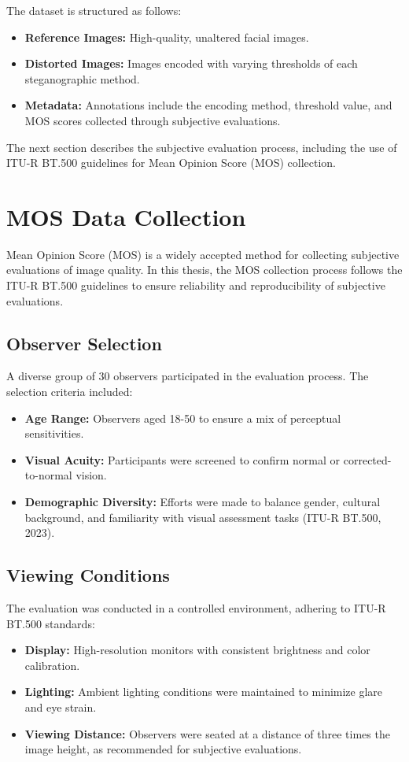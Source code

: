The dataset is structured as follows:
\begin{itemize}
    \item \textbf{Reference Images:} High-quality, unaltered facial images.
    \item \textbf{Distorted Images:} Images encoded with varying thresholds of each steganographic method.
    \item \textbf{Metadata:} Annotations include the encoding method, threshold value, and MOS scores collected through subjective evaluations.
\end{itemize}

The next section describes the subjective evaluation process, including the use of ITU-R BT.500 guidelines for Mean Opinion Score (MOS) collection.

\section{MOS Data Collection}

Mean Opinion Score (MOS) is a widely accepted method for collecting subjective evaluations of image quality. In this thesis, the MOS collection process follows the ITU-R BT.500 guidelines to ensure reliability and reproducibility of subjective evaluations.

\subsection{Observer Selection}

A diverse group of 30 observers participated in the evaluation process. The selection criteria included:
\begin{itemize}
    \item \textbf{Age Range:} Observers aged 18-50 to ensure a mix of perceptual sensitivities.
    \item \textbf{Visual Acuity:} Participants were screened to confirm normal or corrected-to-normal vision.
    \item \textbf{Demographic Diversity:} Efforts were made to balance gender, cultural background, and familiarity with visual assessment tasks (ITU-R BT.500, 2023).
\end{itemize}

\subsection{Viewing Conditions}

The evaluation was conducted in a controlled environment, adhering to ITU-R BT.500 standards:
\begin{itemize}
    \item \textbf{Display:} High-resolution monitors with consistent brightness and color calibration.
    \item \textbf{Lighting:} Ambient lighting conditions were maintained to minimize glare and eye strain.
    \item \textbf{Viewing Distance:} Observers were seated at a distance of three times the image height, as recommended for subjective evaluations.
\end{itemize}

